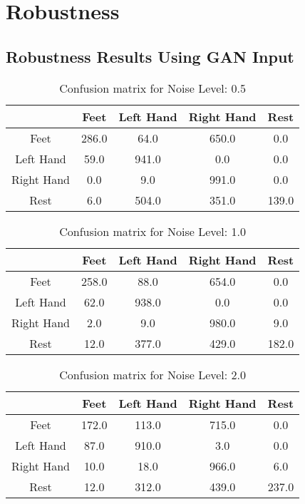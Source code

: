 \chapter{Robustness}\label{app:robustness}

\section{Robustness Results Using GAN Input}\label{app:gan_robustness}
\begin{table}[!htbp]
    \centering
    \begin{tabular}{|c||c|c|c|c|}
        \hline
		 & Feet & Left Hand & Right Hand & Rest \\
        \hline
        \hline
        Feet & 286.0 & 64.0 & 650.0 & 0.0 \\
        \hline
        Left Hand & 59.0 & 941.0 & 0.0 & 0.0 \\
        \hline
        Right Hand & 0.0 & 9.0 & 991.0 & 0.0 \\
        \hline
        Rest & 6.0 & 504.0 & 351.0 & 139.0 \\
        \hline
    \end{tabular}
    \caption{Confusion matrix for Noise Level: 0.5}
\end{table}

\begin{table}[!htbp]
    \centering
    \begin{tabular}{|c||c|c|c|c|}
        \hline
		 & Feet & Left Hand & Right Hand & Rest \\
        \hline
        \hline
        Feet & 258.0 & 88.0 & 654.0 & 0.0 \\
        \hline
        Left Hand & 62.0 & 938.0 & 0.0 & 0.0 \\
        \hline
        Right Hand & 2.0 & 9.0 & 980.0 & 9.0 \\
        \hline
        Rest & 12.0 & 377.0 & 429.0 & 182.0 \\
        \hline
    \end{tabular}
    \caption{Confusion matrix for Noise Level: 1.0}
\end{table}

\begin{table}[!htbp]
    \centering
    \begin{tabular}{|c||c|c|c|c|}
        \hline
		 & Feet & Left Hand & Right Hand & Rest \\
        \hline
        \hline
        Feet & 172.0 & 113.0 & 715.0 & 0.0 \\
        \hline
        Left Hand & 87.0 & 910.0 & 3.0 & 0.0 \\
        \hline
        Right Hand & 10.0 & 18.0 & 966.0 & 6.0 \\
        \hline
        Rest & 12.0 & 312.0 & 439.0 & 237.0 \\
        \hline
    \end{tabular}
    \caption{Confusion matrix for Noise Level: 2.0}
\end{table}


